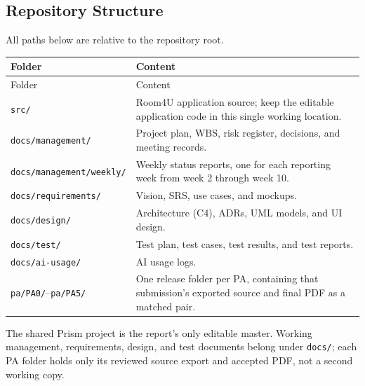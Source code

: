\subsection{Repository Structure}
All paths below are relative to the repository root.
\small
\setlength{\tabcolsep}{4pt}
\begin{longtable}{@{}>{\raggedright\arraybackslash\setlength{\parindent}{0pt}\setlength{\parskip}{0pt}\hyphenpenalty=10000\relax}p{}>{\raggedright\arraybackslash\setlength{\parindent}{0pt}\setlength{\parskip}{0pt}\hyphenpenalty=10000\relax}p{}@{}}
\toprule
Folder & Content \\
\midrule
\endfirsthead
\toprule
Folder & Content \\
\midrule
\endhead
\midrule
\endfoot
\bottomrule
\endlastfoot
\texttt{src/} & Room4U application source; keep the editable application code in this single working location. \\
\texttt{docs/management/} & Project plan, WBS, risk register, decisions, and meeting records. \\
\texttt{docs/management/}\allowbreak\texttt{weekly/} & Weekly status reports, one for each reporting week from week 2 through week 10. \\
\texttt{docs/requirements/} & Vision, SRS, use cases, and mockups. \\
\texttt{docs/design/} & Architecture (C4), ADRs, UML models, and UI design. \\
\texttt{docs/test/} & Test plan, test cases, test results, and test reports. \\
\texttt{docs/ai-usage/} & AI usage logs. \\
\texttt{pa/PA0/}--\texttt{pa/PA5/} & One release folder per PA, containing that submission's exported source and final PDF as a matched pair. \\
\end{longtable}
\normalsize
\setlength{\tabcolsep}{5pt}

The shared Prism project is the report's only editable master. Working management, requirements, design, and test documents belong under \texttt{docs/}; each PA folder holds only its reviewed source export and accepted PDF, not a second working copy.

